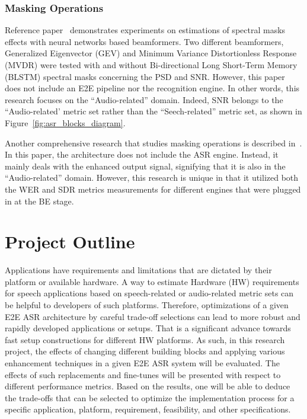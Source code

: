 \subsubsection{Masking Operations}
Reference paper~\cite{7471664} demonstrates experiments on estimations of spectral masks effects
with neural networks based beamformers.
Two different beamformers,  Generalized Eigenvector (GEV)
and Minimum Variance Distortionless Response (MVDR) were tested with and without Bi-directional Long Short-Term Memory (BLSTM)
spectral masks concerning the PSD and SNR.
However, this paper does not include an E2E pipeline nor the recognition engine.
In other words, this research focuses on the ``Audio-related'' domain.
Indeed, SNR belongs to the
``Audio-related' metric set rather than the
``Seech-related'' metric set,
as shown in Figure~\ref{fig:asr_blocks_diagram}.
\bigskip

Another comprehensive research 
that studies masking operations
is described in~\cite{8466865}.
In this paper, the architecture does not include
the ASR engine. 
Instead, it mainly deals with the enhanced output signal,
signifying that it is also in the ``Audio-related'' domain.
However, this research is unique in that
it utilized both the WER and SDR metrics measurements
for different engines that were plugged in at the BE stage.



\section{Project Outline}
Applications have requirements and limitations
that are dictated by their platform or available hardware.
A way to estimate Hardware (HW) requirements for speech
applications based on speech-related or audio-related metric sets
can be helpful to developers of such platforms.
Therefore, optimizations of a given E2E ASR architecture by careful
trade-off selections can lead to more robust and rapidly
developed applications or setups.
That is a significant advance towards fast setup constructions for different HW platforms.
As such, in this research project, the effects of changing different
building blocks and applying various enhancement techniques
in a given E2E ASR system will be evaluated.
The effects of such replacements and
fine-tunes will be presented with respect to different
performance metrics. Based on the results, one will be able to deduce the trade-offs
that can be selected to optimize the implementation process for a specific
application, platform, requirement, feasibility, and other specifications.

